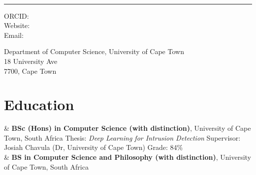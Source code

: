\documentclass[10pt,a4paper]{article}
\begin{document}
\begin{minipage}[t]{0.5\textwidth}
	{\fontsize{20pt}{0}\selectfont\MyName}
\end{minipage}
\begin{minipage}[t]{0.5\textwidth}
	\begin{flushright}
		\Title{}
	\end{flushright}
\end{minipage}
\\[-0.1cm]
\textcolor{lightgray}{\rule{\textwidth}{3pt}}
\begin{minipage}[t]{0.5\textwidth}
	ORCID: \href{https://orcid.org/\ORCID}{\ORCID}
	\\
	Website: \Website{\PersonalWebsite}
	\\
	Email: \href{mailto:\Email}{\Email}
\end{minipage}
\begin{minipage}[t]{0.5\textwidth}
	\begin{flushright}
		Department of Computer Science, University of Cape Town\\
		18 University Ave\\
		7700, Cape Town
	\end{flushright}
\end{minipage}
\vspace{0.3cm}


\section{Education}

\begin{EntriesTableDuration}
	 & \textbf{BSc (Hons) in Computer Science (with distinction)}, University of Cape Town, South Africa \newline
	Thesis: \emph{Deep Learning for Intrusion Detection} \newline
	Supervisor: Josiah Chavula (Dr, University of Cape Town) \newline
	Grade: 84\%
	\\
	 & \textbf{BS in Computer Science and Philosophy (with distinction)}, University of Cape Town, South Africa \newline
\end{EntriesTableDuration}
\end{document}
